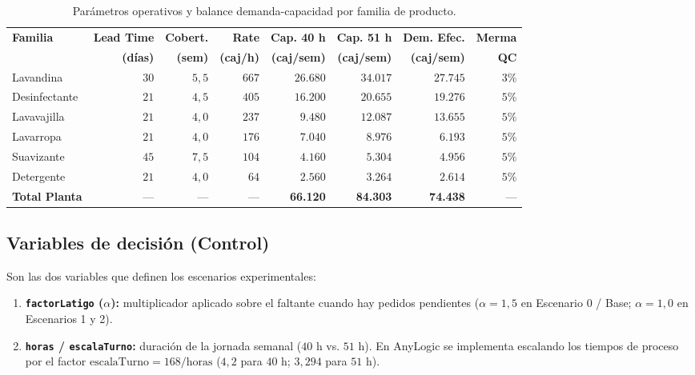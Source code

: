 \documentclass[11pt, a4paper]{article}
\begin{document}
\begin{table}[H]
\centering
\footnotesize
\setlength{\tabcolsep}{4pt}
\caption{Parámetros operativos y balance demanda-capacidad por familia de producto.}
\label{tab:param_familias}
\begin{tabularx}{\textwidth}{l R R R R R R R}
\toprule
\textbf{Familia} & \textbf{Lead Time} & \textbf{Cobert.} & \textbf{Rate} & \textbf{Cap. 40 h} & \textbf{Cap. 51 h} & \textbf{Dem. Efec.} & \textbf{Merma} \\
 & \textbf{(días)} & \textbf{(sem)} & \textbf{(caj/h)} & \textbf{(caj/sem)} & \textbf{(caj/sem)} & \textbf{(caj/sem)} & \textbf{QC} \\
\midrule
Lavandina       & $30$ & $5,5$ & $667$ & $26.680$ & $34.017$ & $27.745$ & $3\%$ \\
Desinfectante   & $21$ & $4,5$ & $405$ & $16.200$ & $20.655$ & $19.276$ & $5\%$ \\
Lavavajilla     & $21$ & $4,0$ & $237$ & $9.480$  & $12.087$ & $\mathbf{13.655}$ & $5\%$ \\
Lavarropa       & $21$ & $4,0$ & $176$ & $7.040$  & $8.976$  & $6.193$  & $5\%$ \\
Suavizante      & $45$ & $7,5$ & $104$ & $4.160$  & $5.304$  & $4.956$  & $5\%$ \\
Detergente      & $21$ & $4,0$ & $64$  & $2.560$  & $3.264$  & $2.614$  & $5\%$ \\
\midrule
\textbf{Total Planta} & --- & --- & --- & \textbf{66.120} & \textbf{84.303} & \textbf{74.438} & --- \\
\bottomrule
\end{tabularx}
\end{table}

\subsection{Variables de decisión (Control)}
Son las dos variables que definen los escenarios experimentales:
\begin{enumerate}[leftmargin=0.5cm, itemsep=1pt]
    \item \textbf{\texttt{factorLatigo} ($\alpha$):} multiplicador aplicado sobre el faltante cuando hay pedidos pendientes ($\alpha = 1,5$ en Escenario 0 / Base; $\alpha = 1,0$ en Escenarios 1 y 2).
    \item \textbf{\texttt{horas} / \texttt{escalaTurno}:} duración de la jornada semanal ($40$ h vs. $51$ h). En AnyLogic se implementa escalando los tiempos de proceso por el factor $\text{escalaTurno} = 168 / \text{horas}$ ($4,2$ para $40$ h; $3,294$ para $51$ h).
\end{enumerate}
\end{document}
